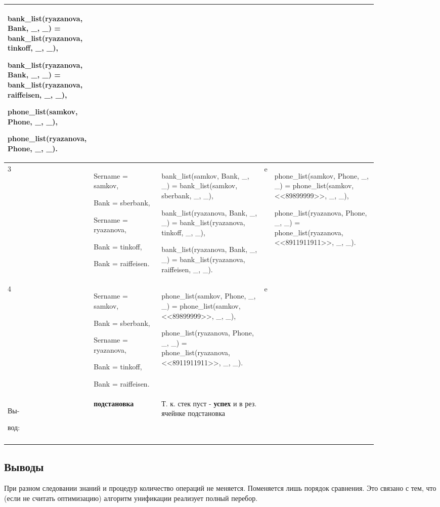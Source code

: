 \documentclass[a4paper,12pt]{article}
\begin{document}
\begin{center}
\begin{longtable}[h!]{|p{0.025\linewidth}|p{0.2\linewidth}|p{ 0.3\linewidth}|p{ 0.025\linewidth}|p{ 0.3\linewidth}|}
{				bank\_list(ryazanova, Bank, \_, \_) = bank\_list(ryazanova, tinkoff, \_, \_),
				
				bank\_list(ryazanova, Bank, \_, \_) = bank\_list(ryazanova, raiffeisen, \_, \_),
				
				phone\_list(samkov, Phone, \_, \_),
				
				phone\_list(ryazanova, Phone, \_, \_).}\\
			\hline
			{3} & {Sername = samkov,
				
				Bank = sberbank,
				
				Sername = ryazanova,
			
		Bank = tinkoff,
	
		Bank = raiffeisen.} & {bank\_list(samkov, Bank, \_, \_) = bank\_list(samkov, sberbank, \_, \_),
				
				bank\_list(ryazanova, Bank, \_, \_) = bank\_list(ryazanova, tinkoff, \_, \_),
			
		bank\_list(ryazanova, Bank, \_, \_) = bank\_list(ryazanova, raiffeisen, \_, \_).} & {e} & {phone\_list(samkov, Phone, \_, \_) = phone\_list(samkov, <<89899999>>, \_, \_),
		
		phone\_list(ryazanova, Phone, \_, \_) = phone\_list(ryazanova, <<8911911911>>, \_, \_).}\\
			\hline
			{4} & {Sername = samkov,
				
				Bank = sberbank,
				
				Sername = ryazanova,
				
				Bank = tinkoff,
				
				Bank = raiffeisen.} & {phone\_list(samkov, Phone, \_, \_) = phone\_list(samkov, <<89899999>>, \_, \_),
				
				phone\_list(ryazanova, Phone, \_, \_) = phone\_list(ryazanova, <<8911911911>>, \_, \_).} & {e} & {}\\
			\hline
			{Вы-
				
				вод:} & {\bf подстановка} & {Т. к. стек пуст - {\bf успех} и в рез. ячейнке подстановка} & {} & {}\\
			\hline
			\label{m4}
		\end{longtable}
	\end{center}
	
	\subsection*{Выводы}
	
	При разном следовании знаний и процедур количество операций не меняется. Поменяется лишь порядок сравнения. Это связано с тем, что (если не считать оптимизацию) алгоритм унификации реализует полный перебор.
	
\end{document}
